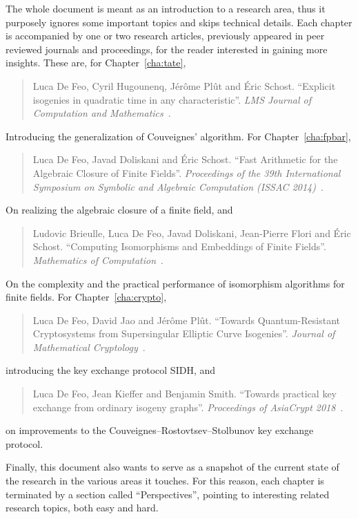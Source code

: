 \documentclass{report}
\theoremstyle{plain}
\theoremstyle{definition}
\begin{document}
The whole document is meant as an introduction to a research area,
thus it purposely ignores some important topics and skips technical
details. %
Each chapter is accompanied by one or two research articles,
previously appeared in peer reviewed journals and proceedings, for the
reader interested in gaining more insights. %
These are, for Chapter~\ref{cha:tate},
\begin{quote}
  Luca De Feo, Cyril Hugounenq, Jérôme Plût and Éric Schost. %
  ``Explicit isogenies in quadratic time in any characteristic''. %
  \emph{LMS Journal of Computation and
    Mathematics}~\cite{defeo2016explicit}.
\end{quote}
Introducing the generalization of Couveignes' algorithm. %
For Chapter~\ref{cha:fpbar},
\begin{quote}
  Luca De Feo, Javad Doliskani and Éric Schost. %
  ``Fast Arithmetic for the Algebraic Closure of Finite Fields''. %
  \emph{Proceedings of the 39th International Symposium on Symbolic
    and Algebraic Computation (ISSAC 2014)}~\cite{DeDoSc2014}.
\end{quote}
On realizing the algebraic closure of a finite field, and
\begin{quote}
  Ludovic Brieulle, Luca De Feo, Javad Doliskani, Jean-Pierre Flori
  and Éric Schost. %
  ``Computing Isomorphisms and Embeddings of Finite Fields''. %
  \emph{Mathematics of Computation}~\cite{brieulle2018computing}.
\end{quote}
On the complexity and the practical performance of isomorphism
algorithms for finite fields. %
For Chapter~\ref{cha:crypto},
\begin{quote}
  Luca De Feo, David Jao and Jérôme Plût. %
  ``Towards Quantum-Resistant Cryptosystems from Supersingular
  Elliptic Curve Isogenies''. %
  \emph{Journal of Mathematical Cryptology}~\cite{defeo+jao+plut12}.
\end{quote}
introducing the key exchange protocol SIDH, and
\begin{quote}
  Luca De Feo, Jean Kieffer and Benjamin Smith. %
  ``Towards practical key exchange from ordinary isogeny graphs''. %
  \emph{Proceedings of AsiaCrypt 2018}~\cite{cryptoeprint:2018:485}.
\end{quote}
on improvements to the Couveignes--Rostovtsev--Stolbunov key exchange
protocol. %

Finally, this document also wants to serve as a snapshot of the
current state of the research in the various areas it touches. %
For this reason, each chapter is terminated by a section called
``Perspectives'', pointing to interesting related research topics,
both easy and hard.
\end{document}
